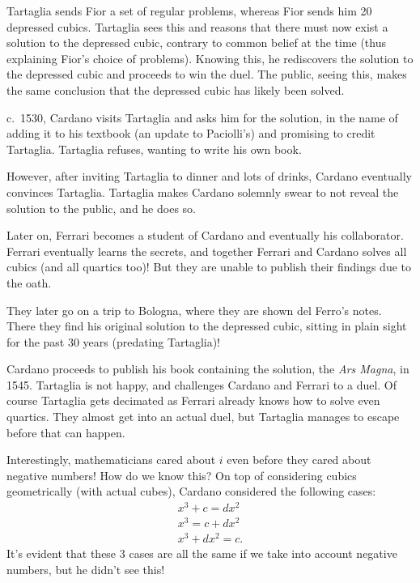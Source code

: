 Tartaglia sends Fior a set of regular problems, 
whereas Fior sends him 20 depressed cubics.
Tartaglia sees this and reasons that there must now
exist a solution to the depressed cubic, contrary to
common belief at the time (thus explaining Fior's
choice of problems). Knowing this, he rediscovers
the solution to the depressed cubic and proceeds to
win the duel. The public, seeing this, makes the same
conclusion that the depressed cubic has likely been
solved.

c.~1530, Cardano visits Tartaglia and asks him for the
solution, in the name of adding it to his textbook
(an update to Paciolli's) and promising to credit
Tartaglia. Tartaglia refuses, wanting to write his
own book.

However, after inviting Tartaglia to dinner and lots
of drinks, Cardano eventually convinces Tartaglia.
Tartaglia makes Cardano solemnly swear to not reveal
the solution to the public, and he does so.

Later on, Ferrari becomes a student of Cardano and
eventually his collaborator. Ferrari eventually learns
the secrets, and together Ferrari and Cardano solves
all cubics (and all quartics too)! But they are unable
to publish their findings due to the oath.

They later go on a trip to Bologna, where they are
shown del Ferro's notes. There they find his original
solution to the depressed cubic, sitting in plain sight
for the past $30$ years (predating Tartaglia)!

Cardano proceeds to publish his book containing the
solution, the \textit{Ars Magna}, in 1545. Tartaglia
is not happy, and challenges Cardano and Ferrari to a
duel. Of course Tartaglia gets decimated as Ferrari
already knows how to solve even quartics. They almost
get into an actual duel, but Tartaglia manages to
escape before that can happen.


\begin{tcolorbox}[title=Aside: Negative numbers]
Interestingly, mathematicians cared about $i$ even
before they cared about negative numbers! How do we know
this? On top of considering cubics geometrically (with
actual cubes), Cardano considered the following cases:
\begin{gather*}
  x^3 + c = dx^2 \\
  x^3 = c + dx^2 \\
  x^3 + dx^2 = c.
\end{gather*}
It's evident that these 3 cases are all the same if
we take into account negative numbers, but he didn't see
this!
\end{tcolorbox}

